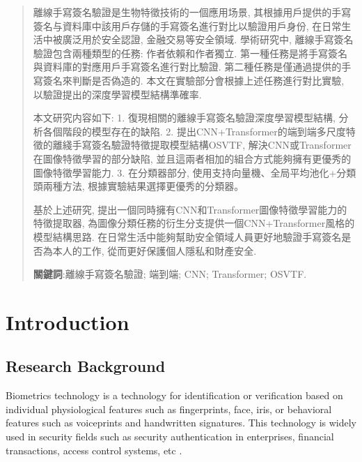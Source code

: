 \documentclass{article}
\begin{document}
\newpage


\clearpage

\renewcommand{\abstractname}{\Large 摘要\\}
\begin{abstract}
	\medskip
	離線手寫簽名驗證是生物特徵技術的一個應用场景, 其根據用戶提供的手寫簽名与資料庫中該用戶存儲的手寫簽名進行對比以驗證用戶身份, 在日常生活中被廣泛用於安全認證, 金融交易等安全領域. 學術研究中, 離線手寫簽名驗證包含兩種類型的任務: 作者依賴和作者獨立. 第一種任務是將手寫簽名與資料庫的對應用戶手寫簽名進行對比驗證. 第二種任務是僅通過提供的手寫簽名來判斷是否偽造的. 本文在實驗部分會根據上述任務進行對比實驗, 以驗證提出的深度學習模型結構準確率.

	本文研究内容如下: 1. 復現相關的離線手寫簽名驗證深度學習模型結構, 分析各個階段的模型存在的缺陷. 2. 提出CNN+Transformer的端到端多尺度特徵的離綫手寫簽名驗證特徵提取模型結構OSVTF, 解決CNN或Transformer在圖像特徵學習的部分缺陷, 並且這兩者相加的組合方式能夠擁有更優秀的圖像特徵學習能力. 3. 在分類器部分, 使用支持向量機、全局平均池化+分類頭兩種方法, 根據實驗結果選擇更優秀的分類器。

	基於上述研究, 提出一個同時擁有CNN和Transformer圖像特徵學習能力的特徵提取器, 為圖像分類任務的衍生分支提供一個CNN+Transformer風格的模型結構思路. 在日常生活中能夠幫助安全領域人員更好地驗證手寫簽名是否為本人的工作, 從而更好保護個人隱私和財產安全.

	\medskip
	\textbf{關鍵詞}:離線手寫簽名驗證; 端到端; CNN; Transformer; OSVTF.
\end{abstract}


\newpage




\tableofcontents

\newpage

\setcounter{page}{1}

\section{Introduction}
\subsection{Research Background}

Biometrics technology is a technology for identification or verification based on individual physiological features such as fingerprints, face, iris, or behavioral features such as voiceprints and handwritten signatures. This technology is widely used in security fields such as security authentication in enterprises, financial transactions, access control systems, etc \cite{1}.
\end{document}

